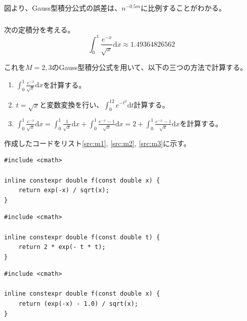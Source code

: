 \documentclass[a4j, titlepage]{jsarticle}
\numberwithin{equation}{section}
\begin{document}
                図より、Gauss型積分公式の誤差は、$n^{-0.5m}$に比例することがわかる。

        \subsubsection{}
            次の定積分を考える。
            \begin{equation*}
                \int_0^1\frac{e^{-x}}{\sqrt{x}}\mathrm{d}x \approx 1.49364826562
            \end{equation*}

            これを$M=2,3$のGauss型積分公式を用いて、以下の三つの方法で計算する。
            \begin{enumerate}
                \item $\displaystyle\int_0^1\frac{e^{-x}}{\sqrt{x}}\mathrm{d}x$を計算する。
                \item $t=\sqrt{x}$と変数変換を行い、$\displaystyle\int_0^12e^{-t^2}\mathrm{d}t$計算する。
                \item $\displaystyle\int_0^1\frac{e^{-x}}{\sqrt{x}}\mathrm{d}x=\int_0^1\frac{1}{\sqrt{x}}\mathrm{d}x+\int_0^1\frac{e^{-x}-1}{\sqrt{x}}\mathrm{d}x=2+\int_0^1\frac{e^{-x}-1}{\sqrt{x}}\mathrm{d}x$を計算する。
            \end{enumerate}

            作成したコードをリスト\ref{src:m1}, \ref{src:m2}, \ref{src:m3}に示す。
            \begin{lstlisting}[caption=方法1の被積分関数の実装, label=src:m1]
#include <cmath>

inline constexpr double f(const double x) {
    return exp(-x) / sqrt(x);
}
            \end{lstlisting}
            \begin{lstlisting}[caption=方法2の被積分関数の実装, label=src:m2]
#include <cmath>

inline constexpr double f(const double t) {
    return 2 * exp(- t * t);
}
            \end{lstlisting}
            \begin{lstlisting}[caption=方法3の被積分関数の実装, label=src:m3]
#include <cmath>

inline constexpr double f(const double x) {
    return (exp(-x) - 1.0) / sqrt(x);
}
            \end{lstlisting}
\end{document}
